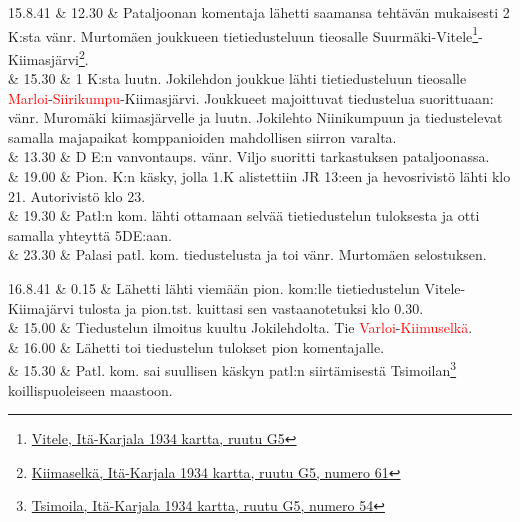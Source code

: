 \documentclass[11pt,a5paper,oneside]{book}
\begin{document}
15.8.41 & 12.30 & Pataljoonan komentaja lähetti saamansa tehtävän mukaisesti 2 K:sta vänr. Murtomäen joukkueen tietiedusteluun tieosalle Suurmäki-Vitele\footnote{\href{https://www.google.fi/maps/place/Vidlitsa,+Republic+of+Karelia,+Russia,+186007/}{Vitele, Itä-Karjala 1934 kartta, ruutu G5}}-Kiimasjärvi\footnote{\href{https://www.google.fi/maps/place/Kimusel'gskoye/@61.200226,32.7254117,16z/}{Kiimaselkä, Itä-Karjala 1934 kartta, ruutu G5, numero 61}}. \\

& 15.30 & 1 K:sta luutn. Jokilehdon joukkue lähti tietiedusteluun tieosalle \textcolor{red}{Marloi}-\textcolor{red}{Siirikumpu}-Kiimasjärvi. \newline Joukkueet majoittuvat tiedustelua suorittuaan: vänr. Muromäki kiimasjärvelle ja luutn. Jokilehto Niinikumpuun ja tiedustelevat samalla majapaikat komppanioiden mahdollisen siirron varalta. \\

& 13.30 & D E:n vanvontaups. vänr. Viljo suoritti tarkastuksen pataljoonassa. \\

& 19.00 & Pion. K:n käsky, jolla 1.K alistettiin JR 13:een ja hevosrivistö lähti klo 21. Autorivistö klo 23. \\

& 19.30 & Patl:n kom. lähti ottamaan selvää tietiedustelun tuloksesta ja otti samalla yhteyttä 5DE:aan. \\

& 23.30 & Palasi patl. kom. tiedustelusta ja toi vänr. Murtomäen selostuksen. \\

\taulustop


16.8.41 & 0.15 & Lähetti lähti viemään pion. kom:lle tietiedustelun Vitele-Kiimajärvi tulosta ja pion.tst. kuittasi sen vastaanotetuksi klo 0.30. \\

& 15.00 & Tiedustelun ilmoitus kuultu Jokilehdolta. Tie \textcolor{red}{Varloi}-\textcolor{red}{Kiimuselkä}. \\

& 16.00 & Lähetti toi tiedustelun tulokset pion komentajalle. \\

& 15.30 & Patl. kom. sai suullisen käskyn patl:n siirtämisestä Tsimoilan\footnote{\href{https://www.google.fi/maps/place/61\%C2\%B013'40.5\%22N+32\%C2\%B044'50.1\%22E/@61.227911,32.7450663,906m/}{Tsimoila, Itä-Karjala 1934 kartta, ruutu G5, numero 54}} koillispuoleiseen maastoon. \\
\end{document}
